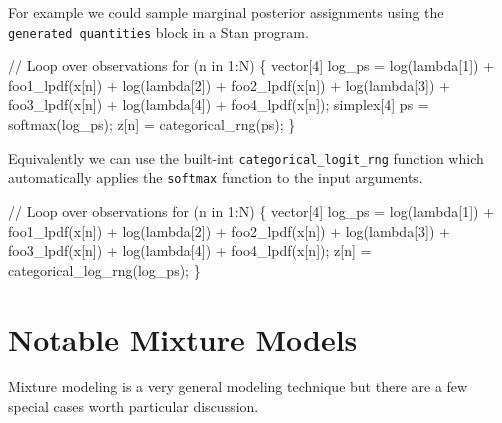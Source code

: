 \documentclass[
  letterpaper,
  DIV=11,
  numbers=noendperiod]{scrartcl}
\newenvironment{Shaded}{\begin{snugshade}}{\end{snugshade}}
\newcommand{\CommentTok}[1]{\textcolor[rgb]{0.37,0.37,0.37}{#1}}
\newcommand{\ControlFlowTok}[1]{\textcolor[rgb]{0.00,0.23,0.31}{#1}}
\newcommand{\DataTypeTok}[1]{\textcolor[rgb]{0.68,0.00,0.00}{#1}}
\newcommand{\DecValTok}[1]{\textcolor[rgb]{0.68,0.00,0.00}{#1}}
\newcommand{\NormalTok}[1]{\textcolor[rgb]{0.00,0.23,0.31}{#1}}
\begin{document}
For example we could sample marginal posterior assignments using the
\texttt{generated\ quantities} block in a Stan program.

\begin{Shaded}
\begin{Highlighting}[]
\CommentTok{// Loop over observations}
\ControlFlowTok{for}\NormalTok{ (n }\ControlFlowTok{in} \DecValTok{1}\NormalTok{:N) \{}
  \DataTypeTok{vector}\NormalTok{[}\DecValTok{4}\NormalTok{] log\_ps =   log(lambda[}\DecValTok{1}\NormalTok{]) + foo1\_lpdf(x[n])}
\NormalTok{                     + log(lambda[}\DecValTok{2}\NormalTok{]) + foo2\_lpdf(x[n])}
\NormalTok{                     + log(lambda[}\DecValTok{3}\NormalTok{]) + foo3\_lpdf(x[n])}
\NormalTok{                     + log(lambda[}\DecValTok{4}\NormalTok{]) + foo4\_lpdf(x[n]);}
  \DataTypeTok{simplex}\NormalTok{[}\DecValTok{4}\NormalTok{] ps = softmax(log\_ps);}
\NormalTok{  z[n] = categorical\_rng(ps);}
\NormalTok{\}}
\end{Highlighting}
\end{Shaded}

Equivalently we can use the built-int \texttt{categorical\_logit\_rng}
function which automatically applies the \texttt{softmax} function to
the input arguments.

\begin{Shaded}
\begin{Highlighting}[]
\CommentTok{// Loop over observations}
\ControlFlowTok{for}\NormalTok{ (n }\ControlFlowTok{in} \DecValTok{1}\NormalTok{:N) \{}
  \DataTypeTok{vector}\NormalTok{[}\DecValTok{4}\NormalTok{] log\_ps =   log(lambda[}\DecValTok{1}\NormalTok{]) + foo1\_lpdf(x[n])}
\NormalTok{                     + log(lambda[}\DecValTok{2}\NormalTok{]) + foo2\_lpdf(x[n])}
\NormalTok{                     + log(lambda[}\DecValTok{3}\NormalTok{]) + foo3\_lpdf(x[n])}
\NormalTok{                     + log(lambda[}\DecValTok{4}\NormalTok{]) + foo4\_lpdf(x[n]);}
\NormalTok{  z[n] = categorical\_log\_rng(log\_ps);}
\NormalTok{\}}
\end{Highlighting}
\end{Shaded}

\section{Notable Mixture Models}\label{notable-mixture-models}

Mixture modeling is a very general modeling technique but there are a
few special cases worth particular discussion.
\end{document}
